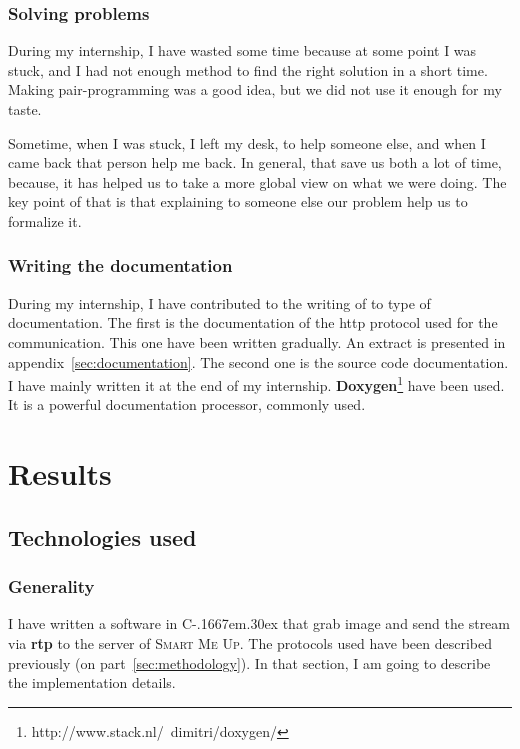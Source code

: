\documentclass[a4paper,11pt]{custom}
\newcommand{\smu}{\textsc{Smart Me Up}\xspace}
\newcommand{\rtp}{\textbf{rtp}\xspace}
\newcommand{\cpp}{%
  C\kern-.1667em\raise.30ex\hbox{\smaller{++}}%
  \spacefactor1000\xspace%
}
\begin{document}
\subsection{Solving problems}

During my internship, I have wasted some time because at some point I was stuck,
and I had not enough method to find the right solution in a short time. Making
pair-programming was a good idea, but we did not use it enough for my taste.

Sometime, when I was stuck, I left my desk, to help someone else, and when I
came back that person help me back. In general, that save us both a lot of time,
because, it has helped us to take a more global view on what we were doing. The key
point of that is that explaining to someone else our problem help us to
formalize it.

\subsection{Writing the documentation}

During my internship, I have contributed to the writing of to type of
documentation. The first is the documentation of the http protocol used for the
communication. This one have been written gradually. An extract is presented in
appendix~\ref{sec:documentation}. The second one is the source
code documentation. I have mainly written it at the end of my internship.
\textbf{Doxygen}\footnote{http://www.stack.nl/~dimitri/doxygen/} have been used.
It is a powerful documentation processor, commonly used.

\chapter{Results}

\section{Technologies used}

\subsection{Generality}

I have written a software in \cpp that grab image and send the stream via \rtp to
the server of \smu. The protocols used have been described previously (on
part~\ref{sec:methodology}). In that section, I am going to describe the
implementation details.
\end{document}
